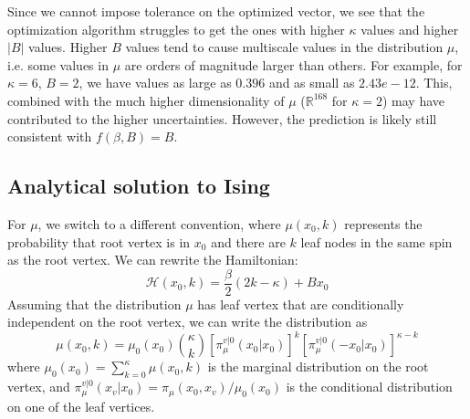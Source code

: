 \documentclass[12pt]{article}
\numberwithin{equation}{section}
\begin{document}
\newpage
Since we cannot impose tolerance on the optimized vector, we see that the optimization algorithm struggles to get the ones with
higher $\kappa$ values and higher $|B|$ values. Higher $B$ values tend to cause multiscale values in the distribution $\mu$, i.e.
some values in $\mu$ are orders of magnitude larger than others. For example, for $\kappa=6$, $B=2$, we have values as large as $0.396$
and as small as $2.43e-12$. This, combined with the much higher dimensionality of $\mu$ ($\mathbb{R}^{168}$ for
$\kappa=2$) may have contributed to the higher uncertainties. However, the prediction is likely still consistent with $f(\beta, B) = B$.

\newpage
\subsection{Analytical solution to Ising}

For $\mu$, we switch to a different convention, where $\mu(x_0, k)$ represents the probability that root vertex is in $x_0$ and there are
$k$ leaf nodes in the same spin as the root vertex.
We can rewrite the Hamiltonian:
\begin{equation*}
    \mathcal{H}(x_0, k) = \frac\beta2(2k-\kappa) + Bx_0
\end{equation*}
Assuming that the distribution $\mu$ has leaf vertex that are conditionally independent on the root vertex, we can write the distribution as
\begin{equation*}
    \mu(x_0, k) = \mu_0(x_0){\kappa \choose k}\left[\pi_\mu^{v|0}(x_0|x_0)\right]^k\left[\pi_\mu^{v|0}(-x_0|x_0)\right]^{\kappa - k}
\end{equation*}
where $\mu_0(x_0)=\sum_{k=0}^\kappa \mu(x_0, k)$ is the marginal distribution on the root vertex, and
$\pi_\mu^{v|0}(x_v|x_0) = \pi_\mu(x_0, x_v) / \mu_0(x_0)$ is the conditional distribution on one of the leaf vertices.
\end{document}

